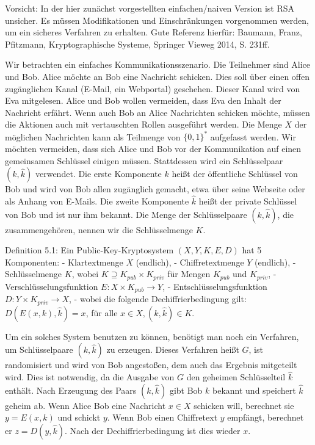 \documentclass[a4paper]{article}
\begin{document}
\begin{multicols}{3}
        Vorsicht: In der hier zunächst vorgestellten einfachen/naiven Version ist RSA unsicher. Es müssen Modifikationen und Einschränkungen vorgenommen werden, um ein
        sicheres Verfahren zu erhalten. Gute Referenz hierfür: Baumann, Franz, Pfitzmann, Kryptographische Systeme, Springer Vieweg 2014, S. 231ff.

        Wir betrachten ein einfaches Kommunikationsszenario. Die Teilnehmer sind Alice und Bob. Alice möchte an Bob eine Nachricht schicken. Dies soll über einen offen zugänglichen Kanal (E-Mail, ein Webportal) geschehen. Dieser Kanal wird von Eva mitgelesen. Alice und Bob wollen vermeiden, dass Eva den Inhalt der Nachricht erfährt. Wenn auch Bob an Alice Nachrichten schicken möchte, müssen die Aktionen auch mit vertauschten Rollen ausgeführt werden.
        Die Menge $X$ der möglichen Nachrichten kann als Teilmenge von $\{0,1\}^*$ aufgefasst werden. Wir möchten vermeiden, dass sich Alice und Bob vor der Kommunikation auf einen gemeinsamen Schlüssel einigen müssen. Stattdessen wird ein Schlüsselpaar $(k,\hat{k})$ verwendet. Die erste Komponente $k$ heißt der öffentliche Schlüssel von Bob und wird von Bob allen zugänglich gemacht, etwa über seine Webseite oder als Anhang von E-Mails. Die zweite Komponente $\hat{k}$ heißt der private Schlüssel von Bob und ist nur ihm bekannt. Die Menge der Schlüsselpaare $(k,\hat{k})$, die zusammengehören, nennen wir die Schlüsselmenge $K$.

        Definition 5.1: Ein Public-Key-Kryptosystem $(X,Y,K,E,D)$ hat 5 Komponenten:
        - Klartextmenge $X$ (endlich),
        - Chiffretextmenge $Y$ (endlich),
        - Schlüsselmenge $K$, wobei $K\supseteq K_{pub} \times K_{priv}$ für Mengen $K_{pub}$ und $K_{priv}$,
        - Verschlüsselungsfunktion $E:X\times K_{pub} \rightarrow Y$,
        - Entschlüsselungsfunktion $D:Y\times K_{priv} \rightarrow X$,
        - wobei die folgende Dechiffrierbedingung gilt: $D(E(x,k), \hat{k}) =x$, für alle $x\in X,(k,\hat{k})\in K$.

        Um ein solches System benutzen zu können, benötigt man noch ein Verfahren, um Schlüsselpaare $(k,\hat{k})$ zu erzeugen. Dieses Verfahren heißt $G$, ist randomisiert und wird von Bob angestoßen, dem auch das Ergebnis mitgeteilt wird. Dies ist notwendig, da die Ausgabe von $G$ den geheimen Schlüsselteil $\hat{k}$ enthält. Nach Erzeugung des Paars $(k,\hat{k})$ gibt Bob $k$ bekannt und speichert $\hat{k}$ geheim ab. Wenn Alice Bob eine Nachricht $x\in X$ schicken will, berechnet sie $y=E(x,k)$ und schickt $y$. Wenn Bob einen Chiffretext $y$ empfängt, berechnet er $z=D(y,\hat{k})$. Nach der Dechiffrierbedingung ist dies wieder $x$.


\end{multicols}
\end{document}
